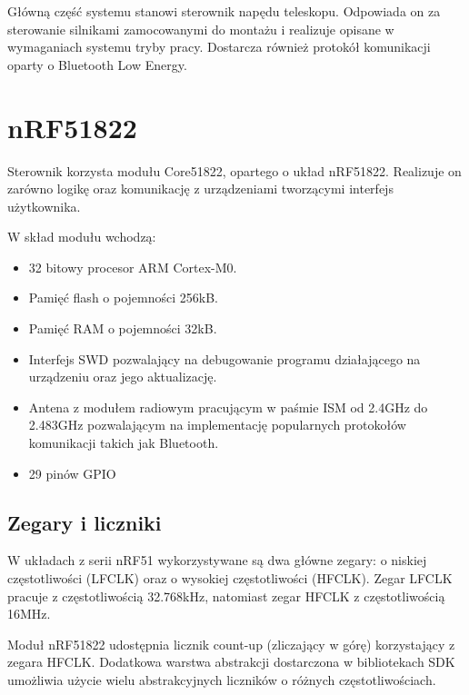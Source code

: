 Główną część systemu stanowi sterownik napędu teleskopu. Odpowiada on za
sterowanie silnikami zamocowanymi do montażu i realizuje opisane w wymaganiach
systemu tryby pracy. Dostarcza również protokół komunikacji oparty o Bluetooth
Low Energy.

\section{nRF51822}

Sterownik korzysta modułu Core51822, opartego o układ nRF51822. Realizuje on
zarówno logikę oraz komunikację z urządzeniami tworzącymi interfejs użytkownika.

W skład modułu wchodzą:

\begin{itemize}

	\item 32 bitowy procesor ARM Cortex-M0.

	\item Pamięć flash o pojemności 256kB.

	\item Pamięć RAM o pojemności 32kB.

	\item Interfejs SWD pozwalający na debugowanie programu działającego na
		urządzeniu oraz jego aktualizację.

	\item Antena z modułem radiowym pracującym w paśmie ISM od 2.4GHz do
2.483GHz pozwalającym na implementację popularnych protokołów komunikacji takich
		jak Bluetooth.

	\item 29 pinów GPIO

\end{itemize}

\subsection{Zegary i liczniki}

W układach z serii nRF51 wykorzystywane są dwa główne zegary: o niskiej
częstotliwości (LFCLK) oraz o wysokiej częstotliwości (HFCLK). Zegar LFCLK
pracuje z częstotliwością 32.768kHz, natomiast zegar HFCLK z częstotliwością
16MHz.

Moduł nRF51822 udostępnia licznik count-up (zliczający w górę) korzystający
z zegara HFCLK. Dodatkowa warstwa abstrakcji dostarczona w bibliotekach SDK
umożliwia użycie wielu abstrakcyjnych liczników o różnych częstotliwościach.

